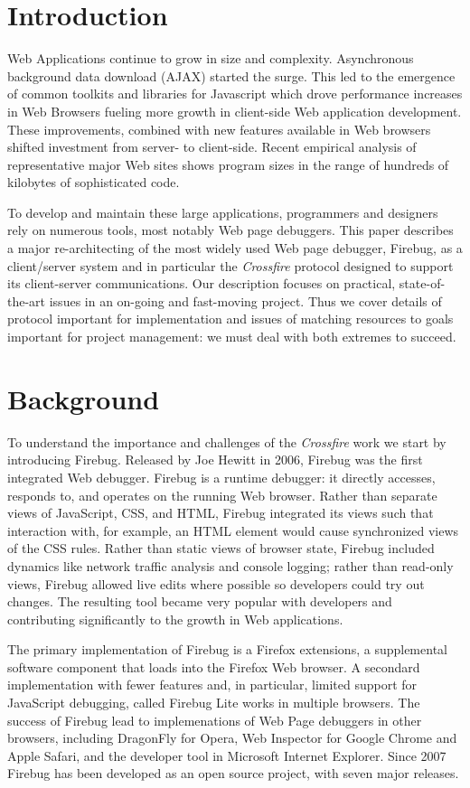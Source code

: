 
\section{Introduction}
Web Applications continue to grow in size and complexity. Asynchronous
background data download (AJAX) started the surge. This led to the emergence of
common toolkits and libraries for Javascript which drove  performance increases
in Web Browsers fueling more growth in client-side Web application development.
These improvements, combined with new features available in Web browsers shifted
investment from server- to client-side. Recent empirical analysis of
representative
 major Web sites shows program sizes in the range of hundreds of kilobytes of
sophisticated code.\cite{VitekDynamicJS2010}

To develop and maintain these large applications, programmers and designers rely
on numerous tools, most notably Web page debuggers. This paper describes a major
re-architecting of the most widely used Web page debugger, Firebug, as a
client/server system and in particular the \textit{Crossfire} protocol designed
to support its client-server communications. Our description focuses on
practical, state-of-the-art issues in an on-going and fast-moving project. Thus
we cover details of protocol important for implementation and issues of matching
resources to goals important for project management: we must deal with both
extremes to succeed.

\section{Background}
To understand the importance and challenges of the \textit{Crossfire} work we
start by introducing Firebug. Released by Joe Hewitt in 2006, Firebug was the
first integrated Web debugger. Firebug is a runtime debugger: it directly
accesses, responds to, and operates on the running Web browser.  Rather than
separate views of JavaScript, CSS, and HTML, Firebug integrated its views such
that interaction with, for example, an HTML element would cause synchronized
views of the CSS rules. Rather than static
 views of browser state, Firebug included dynamics like network traffic analysis
 and console logging; rather
than read-only views, Firebug allowed live edits where possible so developers
could try out changes. The resulting tool became very popular with developers
and contributing significantly to the growth in Web applications.

The primary implementation of Firebug is a Firefox extensions, a supplemental
software component that loads into the Firefox Web browser. A secondard
implementation with fewer features and, in particular, limited support for
JavaScript debugging, called Firebug Lite works in multiple browsers. The
success of Firebug lead to implemenations of Web Page debuggers in other
browsers, including DragonFly for Opera, Web Inspector for Google Chrome and
Apple Safari, and the developer tool in Microsoft Internet Explorer. Since 2007
Firebug has been developed as an open source project, with seven major releases.

